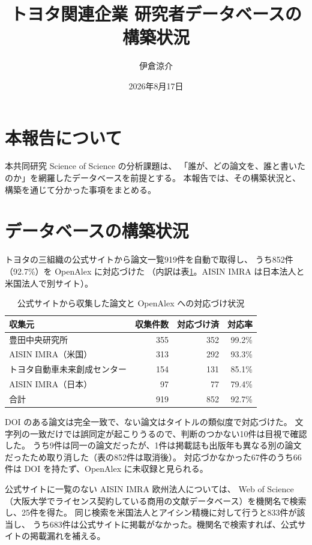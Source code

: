 \documentclass[a4paper,10pt]{ltjsarticle}
\title{トヨタ関連企業 研究者データベースの構築状況}
\author{伊倉涼介}
\date{2026年8月17日}
\begin{document}
\maketitle


\section{本報告について}

本共同研究 Science of Science の分析課題は、
「誰が、どの論文を、誰と書いたのか」を網羅したデータベースを前提とする。
本報告では、その構築状況と、構築を通じて分かった事項をまとめる。

\section{データベースの構築状況}

トヨタの三組織の公式サイトから論文一覧919件を自動で取得し、
うち852件（92.7\%）を OpenAlex に対応づけた
（内訳は表\ref{tab:corpus}。AISIN IMRA は日本法人と米国法人で別サイト）。

\begin{table}[htbp]
\centering
\caption{公式サイトから収集した論文と OpenAlex への対応づけ状況}
\label{tab:corpus}
\begin{tabular}{lrrr}
\toprule
収集元 & 収集件数 & 対応づけ済 & 対応率 \\
\midrule
豊田中央研究所 & 355 & 352 & 99.2\% \\
AISIN IMRA（米国） & 313 & 292 & 93.3\% \\
トヨタ自動車未来創成センター & 154 & 131 & 85.1\% \\
AISIN IMRA（日本） & 97 & 77 & 79.4\% \\
\midrule
合計 & 919 & 852 & 92.7\% \\
\bottomrule
\end{tabular}
\end{table}

DOI のある論文は完全一致で、ない論文はタイトルの類似度で対応づけた。
文字列の一致だけでは誤同定が起こりうるので、判断のつかない10件は目視で確認した。
うち9件は同一の論文だったが、1件は掲載誌も出版年も異なる別の論文だったため取り消した（表の852件は取消後）。
対応づかなかった67件のうち66件は DOI を持たず、OpenAlex に未収録と見られる。

公式サイトに一覧のない AISIN IMRA 欧州法人については、
Web of Science（大阪大学でライセンス契約している商用の文献データベース）を機関名で検索し、25件を得た。
同じ検索を米国法人とアイシン精機に対して行うと833件が該当し、
うち683件は公式サイトに掲載がなかった。機関名で検索すれば、公式サイトの掲載漏れを補える。
\end{document}
